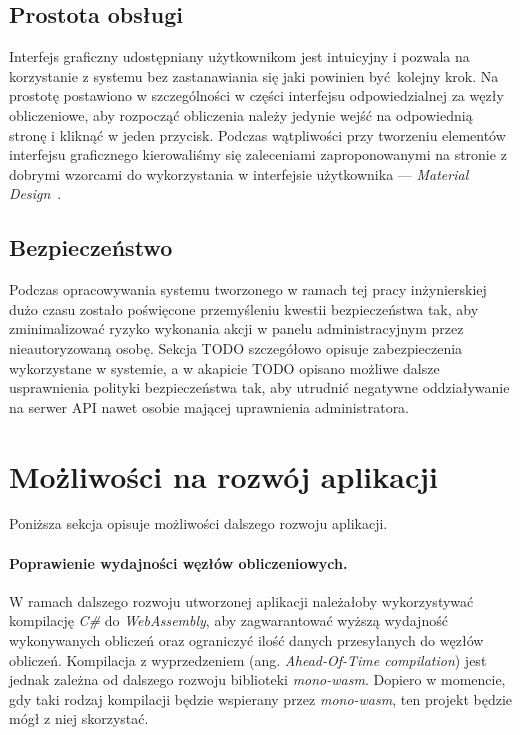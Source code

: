 \documentclass[a4paper,11pt,twoside]{report}
\theoremstyle{definition}
\begin{document}
        \subsection{Prostota obsługi}
            Interfejs graficzny udostępniany użytkownikom jest intuicyjny i pozwala na korzystanie z systemu bez zastanawiania się jaki powinien być kolejny krok.
            Na prostotę postawiono w szczególności w części interfejsu odpowiedzialnej za węzły obliczeniowe, aby rozpocząć obliczenia należy jedynie wejść na odpowiednią stronę i kliknąć w jeden przycisk.
            Podczas wątpliwości przy tworzeniu elementów interfejsu graficznego kierowaliśmy się zaleceniami zaproponowanymi na stronie z dobrymi wzorcami do wykorzystania w interfejsie użytkownika --- \textit{Material Design}~\cite{material-design}.
        
        \subsection{Bezpieczeństwo}
            Podczas opracowywania systemu tworzonego w ramach tej pracy inżynierskiej dużo czasu zostało poświęcone przemyśleniu kwestii bezpieczeństwa tak, aby zminimalizować ryzyko wykonania akcji w panelu administracyjnym przez nieautoryzowaną osobę.
            Sekcja TODO szczegółowo opisuje zabezpieczenia wykorzystane w systemie, a w akapicie TODO opisano możliwe dalsze usprawnienia polityki bezpieczeństwa tak, aby utrudnić negatywne oddziaływanie na serwer API nawet osobie mającej uprawnienia administratora.
    
    \section{Możliwości na rozwój aplikacji}
        Poniższa sekcja opisuje możliwości dalszego rozwoju aplikacji.
    
        \paragraph{Poprawienie wydajności węzłów obliczeniowych.}
        W ramach dalszego rozwoju utworzonej aplikacji należałoby wykorzystywać kompilację \textit{C\#} do \textit{WebAssembly}, aby zagwarantować wyższą wydajność wykonywanych obliczeń oraz ograniczyć ilość danych przesyłanych do węzłów obliczeń. Kompilacja z wyprzedzeniem (ang. \textit{Ahead-Of-Time compilation}) jest jednak zależna od dalszego rozwoju biblioteki \textit{mono-wasm}. Dopiero w momencie, gdy taki rodzaj kompilacji będzie wspierany przez \textit{mono-wasm}, ten projekt będzie mógł z niej skorzystać.
        
\end{document}
